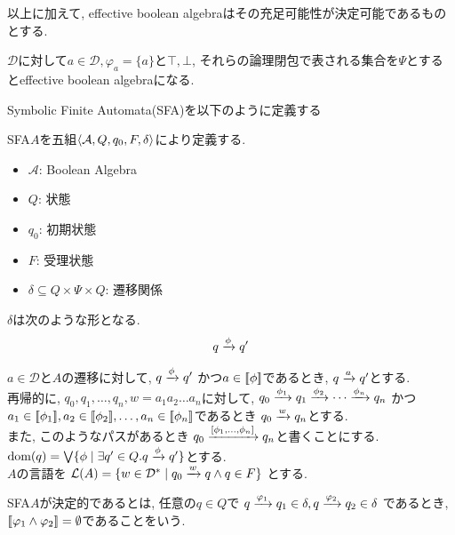 \documentclass[uplatex,dvipdfmx,a4j]{jsreport}
\begin{document}
  以上に加えて, effective boolean algebraはその充足可能性が決定可能であるものとする.
  \begin{example}
    $\mathcal{D}$に対して$a \in \mathcal{D}, \varphi_a = \{ a \}$と$\top, \bot$,
    それらの論理閉包で表される集合を$\Psi$とするとeffective boolean algebraになる.
  \end{example}

  Symbolic Finite Automata(SFA)を以下のように定義する

  \begin{definition}

    SFA$A$を五組${\langle {\mathcal{A}, Q, q_0, F, \delta} \rangle}$により定義する.
    \begin{itemize}
      \item $\mathcal{A}$: Boolean Algebra
      \item $Q$: 状態
      \item $q_0$: 初期状態
      \item $F$: 受理状態
      \item $\delta \subseteq Q \times \Psi \times Q$: 遷移関係
    \end{itemize}

    $\delta$は次のような形となる.
    \[
      q \xrightarrow[]{\phi} q'
    \]
  \end{definition}

  $a \in \mathcal{D}$と$A$の遷移に対して, $q \xrightarrow[]{\phi} q'$
  かつ$a \in {[ \! [{\phi}] \! ]}$であるとき, $q \xrightarrow[]{a} q'$とする. \\
  再帰的に, $q_0, q_1, \ldots, q_n, w = a_1 a_2 \ldots a_n$に対して,
  $q_0 \xrightarrow[]{\phi_1} q_1 \xrightarrow[]{\phi_2}
  \cdots \xrightarrow[]{\phi_n} q_n$
  かつ$a_1 \in {[ \! [{\phi_1}] \! ]}, a_2 \in {[ \! [{\phi_2}] \! ]},
  \ldots, a_n \in {[ \! [{\phi_n}] \! ]}$であるとき
  $q_0 \xrightarrow[]{w} q_n$とする. \\
  また, このようなパスがあるとき
  $q_0 \xrightarrow[]{[\phi_1, \ldots, \phi_n]} q_n$と書くことにする. \\
  $\mbox{dom}(q) = \bigvee\{\phi \mid \exists q' \in Q. q \xrightarrow[]{\phi} q'\}$とする. \\
  $A$の言語を
  $\mathcal{L}(A) =
  \{ w \in \mathcal{D}^* \mid q_0 \xrightarrow[]{w} q \land q \in F \}$
  とする.

  SFA$A$が決定的であるとは,
  任意の$q \in Q$で
  $q \xrightarrow[]{\varphi_1} q_1 \in \delta, q \xrightarrow[]{\varphi_2} q_2 \in \delta$
  であるとき, ${[ \! [{\varphi_1 \land \varphi_2}] \! ]} = \emptyset$であることをいう.
\end{document}
